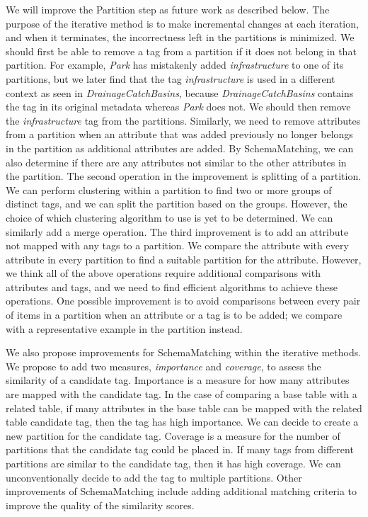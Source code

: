 We will improve the Partition step as future work as described below. The purpose of the iterative method is to make incremental changes at each iteration, and when it terminates, the incorrectness left in the partitions is minimized. We should first be able to remove a tag from a partition if it does not belong in that partition. For example, \textit{Park} has mistakenly added \textit{infrastructure} to one of its partitions, but we later find that the tag \textit{infrastructure} is used in a different context as seen in \textit{DrainageCatchBasins}, because \textit{DrainageCatchBasins} contains the tag in its original metadata whereas \textit{Park} does not. We should then remove the \textit{infrastructure} tag from the partitions. Similarly, we need to remove attributes from a partition when an attribute that was added previously no longer belongs in the partition as additional attributes are added. By SchemaMatching, we can also determine if there are any attributes not similar to the other attributes in the partition. The second operation in the improvement is splitting of a partition. We can perform clustering within a partition to find two or more groups of distinct tags, and we can split the partition based on the groups. However, the choice of which clustering algorithm to use is yet to be determined. We can similarly add a merge operation. The third improvement is to add an attribute not mapped with any tags to a partition. We compare the attribute with every attribute in every partition to find a suitable partition for the attribute. However, we think all of the above operations require additional comparisons with attributes and tags, and we need to find efficient algorithms to achieve these operations. One possible improvement is to avoid comparisons between every pair of items in a partition when an attribute or a tag is to be added; we compare with a representative example in the partition instead.

We also propose improvements for SchemaMatching within the iterative methods. We propose to add two measures, \textit{importance} and \textit{coverage}, to assess the similarity of a candidate tag. Importance is a measure for how many attributes are mapped with the candidate tag. In the case of comparing a base table with a related table, if many attributes in the base table can be mapped with the related table candidate tag, then the tag has high importance. We can decide to create a new partition for the candidate tag. Coverage is a measure for the number of partitions that the candidate tag could be placed in. If many tags from different partitions are similar to the candidate tag, then it has high coverage. We can unconventionally decide to add the tag to multiple partitions. Other improvements of SchemaMatching include adding additional matching criteria to improve the quality of the similarity scores.

